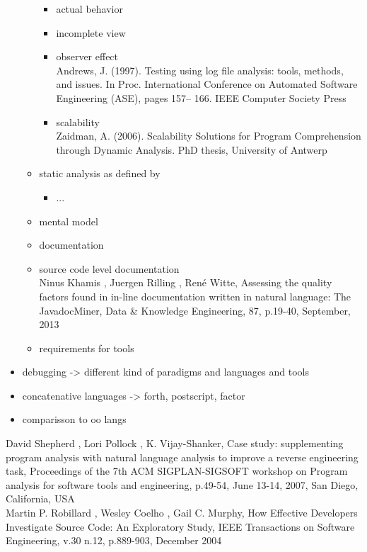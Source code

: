 \begin{itemize}
\begin{itemize}
\begin{itemize}
		\item actual behavior
		\item incomplete view \cite{Ball:1999:CDA:318774.318944}
		\item observer effect \\
		Andrews, J. (1997). Testing using log file analysis: tools, methods, and issues.
		In Proc. International Conference on Automated Software Engineering (ASE), pages 157–
		166. IEEE Computer Society Press
		\item scalability \\
		Zaidman, A. (2006). Scalability Solutions for Program Comprehension through Dynamic
		Analysis. PhD thesis, University of Antwerp
		\end{itemize}
	\item static analysis as defined by \cite{Ball:1999:CDA:318774.318944}
		\begin{itemize}
		\item ...
		\end{itemize}
	\item mental model
	\item documentation
	\item source code level documentation \\ Ninus Khamis , Juergen Rilling , René Witte, Assessing the quality factors found in in-line documentation written in natural language: The JavadocMiner, Data \& Knowledge Engineering, 87, p.19-40, September, 2013
	\item requirements for tools
	\end{itemize}
\item debugging -> different kind of paradigms and languages and tools
\item concatenative languages -> forth, postscript, factor
\item comparisson to oo langs
\end{itemize}

David Shepherd , Lori Pollock , K. Vijay-Shanker, Case study: supplementing program analysis with natural language analysis to improve a reverse engineering task, Proceedings of the 7th ACM SIGPLAN-SIGSOFT workshop on Program analysis for software tools and engineering, p.49-54, June 13-14, 2007, San Diego, California, USA \\

Martin P. Robillard , Wesley Coelho , Gail C. Murphy, How Effective Developers Investigate Source Code: An Exploratory Study, IEEE Transactions on Software Engineering, v.30 n.12, p.889-903, December 2004\\

